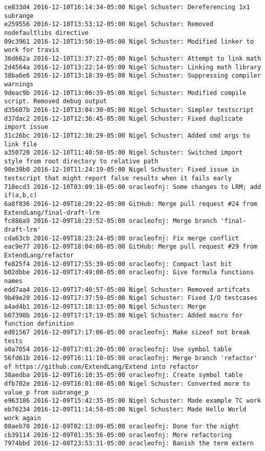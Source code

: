\begin{lstlisting}
ce833d4 2016-12-10T16:14:34-05:00 Nigel Schuster: Dereferencing 1x1 subrange
e259556 2016-12-10T13:53:12-05:00 Nigel Schuster: Removed nodefaultlibs directive
09c3961 2016-12-10T13:50:19-05:00 Nigel Schuster: Modified linker to work for travis
36d662a 2016-12-10T13:37:27-05:00 Nigel Schuster: Attempt to link math
2d4564a 2016-12-10T13:22:14-05:00 Nigel Schuster: Linking math library
38ba6e6 2016-12-10T13:18:39-05:00 Nigel Schuster: Suppressing compiler warnings
9deac9b 2016-12-10T13:06:39-05:00 Nigel Schuster: Modified compile script. Removed debug output
d35607b 2016-12-10T13:04:30-05:00 Nigel Schuster: Simpler testscript
d37dac2 2016-12-10T12:36:45-05:00 Nigel Schuster: Fixed duplicate import issue
31c26bc 2016-12-10T12:30:29-05:00 Nigel Schuster: Added cmd args to link file
a350720 2016-12-10T11:40:50-05:00 Nigel Schuster: Switched import style from root directory to relative path
90e39b0 2016-12-10T11:24:19-05:00 Nigel Schuster: Fixed issue in testscript that might report false results when it fails early
718ecd3 2016-12-10T03:09:18-05:00 oracleofnj: Some changes to LRM; add if(a,b,c)
6a8f836 2016-12-09T18:29:22-05:00 GitHub: Merge pull request #24 from ExtendLang/final-draft-lrm
fc886a9 2016-12-09T18:23:52-05:00 oracleofnj: Merge branch 'final-draft-lrm'
cda63cb 2016-12-09T18:23:24-05:00 oracleofnj: Fix merge conflict
eac9e77 2016-12-09T18:04:08-05:00 GitHub: Merge pull request #29 from ExtendLang/refactor
fe825f4 2016-12-09T17:55:39-05:00 oracleofnj: Compact last bit
b02dbbe 2016-12-09T17:49:00-05:00 oracleofnj: Give formula functions names
edd7aa4 2016-12-09T17:40:57-05:00 Nigel Schuster: Removed artifcats
9b49e20 2016-12-09T17:37:59-05:00 Nigel Schuster: Fixed I/O testcases
a4ad4b1 2016-12-09T17:18:13-05:00 Nigel Schuster: Merge
b07398b 2016-12-09T17:17:19-05:00 Nigel Schuster: Added macro for function definition
ed01567 2016-12-09T17:17:06-05:00 oracleofnj: Make sizeof not break tests
a0a7054 2016-12-09T17:01:20-05:00 oracleofnj: Use symbol table
56fd61b 2016-12-09T16:11:10-05:00 oracleofnj: Merge branch 'refactor' of https://github.com/ExtendLang/Extend into refactor
38aedba 2016-12-09T16:10:35-05:00 oracleofnj: Create symbol table
dfb702e 2016-12-09T16:01:08-05:00 Nigel Schuster: Converted more to value_p from subrange_p
e963186 2016-12-09T15:42:35-05:00 Nigel Schuster: Made example TC work
eb76234 2016-12-09T11:14:58-05:00 Nigel Schuster: Made Hello World work again
08aeb70 2016-12-09T02:13:09-05:00 oracleofnj: Done for the night
cb39114 2016-12-09T01:35:36-05:00 oracleofnj: More refactoring
7974bbd 2016-12-08T23:53:31-05:00 oracleofnj: Banish the term extern

\end{lstlisting}
